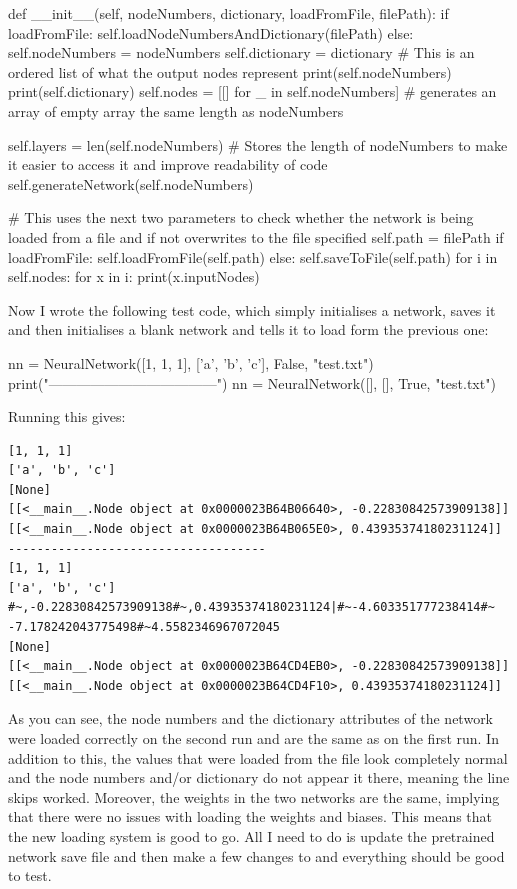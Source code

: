\documentclass{report}
\begin{document}
\begin{python}
def __init__(self, nodeNumbers, dictionary, loadFromFile, filePath):
    if loadFromFile:
        self.loadNodeNumbersAndDictionary(filePath)
    else:
        self.nodeNumbers = nodeNumbers
        self.dictionary = dictionary  # This is an ordered list of what the output nodes represent
    print(self.nodeNumbers)
    print(self.dictionary)
    self.nodes = [[] for _ in self.nodeNumbers]  # generates an array of empty array the same length as nodeNumbers
    
    self.layers = len(self.nodeNumbers)  # Stores the length of nodeNumbers to make it easier to access it and improve readability of code
    self.generateNetwork(self.nodeNumbers)

    # This uses the next two parameters to check whether the network is being loaded from a file and if not overwrites to the file specified
    self.path = filePath
    if loadFromFile:
        self.loadFromFile(self.path)
    else:
        self.saveToFile(self.path)
    for i in self.nodes:
        for x in i:
            print(x.inputNodes)
\end{python}
Now I wrote the following test code, which  simply initialises a network, saves it and then initialises a blank network and tells it to load form the previous one:
\begin{python}
nn = NeuralNetwork([1, 1, 1], ['a', 'b', 'c'], False, "test.txt")
print("------------------------------------")
nn = NeuralNetwork([], [], True, "test.txt")
\end{python}
Running this gives:
\begin{verbatim}
[1, 1, 1]
['a', 'b', 'c']
[None]
[[<__main__.Node object at 0x0000023B64B06640>, -0.22830842573909138]]
[[<__main__.Node object at 0x0000023B64B065E0>, 0.43935374180231124]]
------------------------------------
[1, 1, 1]
['a', 'b', 'c']
#~,-0.22830842573909138#~,0.43935374180231124|#~-4.603351777238414#~
-7.178242043775498#~4.5582346967072045
[None]
[[<__main__.Node object at 0x0000023B64CD4EB0>, -0.22830842573909138]]
[[<__main__.Node object at 0x0000023B64CD4F10>, 0.43935374180231124]]
\end{verbatim}
As you can see, the node numbers and the dictionary attributes of the network were loaded correctly on the second run and are the same as on the first run. In addition to this, the values that were loaded from the file look completely normal and the node numbers and/or dictionary do not appear it there, meaning the line skips worked. Moreover, the weights in the two networks are the same, implying that there were no issues with loading the weights and biases. This means that the new loading system is good to go. All I need to do is update the pretrained network save file and then make a few changes to  and everything should be good to test.
\end{document}
